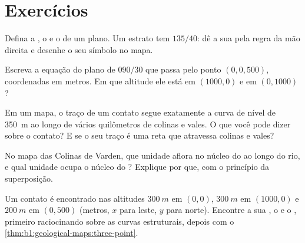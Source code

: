 \section{Exercícios}

\begin{exercise}[$\star$]\label{exo:b1:geological-maps:1}
Defina a , o  e o  de um plano. Um estrato tem  $135/40$: dê a sua  pela regra da mão direita e desenhe o seu símbolo no mapa.
\end{exercise}

\begin{exercise}[$\star$]\label{exo:b1:geological-maps:2}
Escreva a equação do plano de  $090/30$ que passa pelo ponto
$(0, 0, 500)$, coordenadas em metros. Em que altitude ele está em $(1000, 0)$ e em $(0, 1000)$?
\end{exercise}

\begin{exercise}[$\star$]\label{exo:b1:geological-maps:3}
Em um mapa, o traço de um contato segue exatamente a curva de nível de \qty{350}{m} ao longo de vários quilômetros de colinas e vales. O que você pode dizer sobre o contato? E se o seu traço é uma reta que atravessa colinas e vales?
\end{exercise}

\begin{exercise}[$\star$]\label{exo:b1:geological-maps:4}
No mapa das Colinas de Varden, que unidade aflora no núcleo do  ao longo do rio, e qual unidade ocupa o núcleo do ? Explique por que, com o princípio da superposição.
\end{exercise}

\begin{exercise}[$\star\star$]\label{exo:b1:geological-maps:5}
Um contato é encontrado nas altitudes $\qty{300}{m}$ em $(0, 0)$, $\qty{300}{m}$ em $(1000, 0)$ e $\qty{200}{m}$ em $(0, 500)$ (metros, $x$ para leste, $y$ para norte). Encontre a sua , o  e o , primeiro raciocinando sobre as curvas estruturais, depois com o \cref{thm:b1:geological-maps:three-point}.
\end{exercise}

